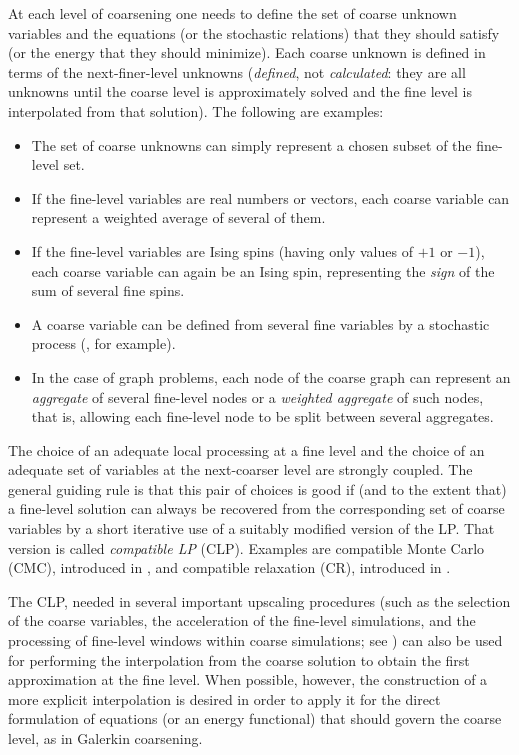 \documentclass[final]{siamltex}
\begin{document}
At each level of coarsening one needs to define the set of  coarse
unknown variables and the equations (or the stochastic relations)
that they should satisfy (or the energy that they should
minimize). Each coarse unknown is defined in terms of the
next-finer-level unknowns ({\it defined}, not {\it calculated}: they  are all unknowns until the coarse level is approximately solved and the fine level is interpolated from
that solution). The following are examples:
\begin{itemize}
    \item The set of coarse unknowns can simply represent a chosen
    subset of the fine-level set.
    \item If the fine-level variables are real numbers or vectors,
    each coarse variable can represent a weighted average of
    several of them.
    \item If the fine-level variables are Ising spins (having only
    values of $+1$ or $-1$), each coarse variable can again be an
    Ising spin, representing the {\it sign} of the sum of  several
    fine spins.
    \item A coarse variable can be defined from several fine
    variables by a stochastic process (\cite{blote96}, for example).
    \item In the case of graph problems, each node of the coarse
    graph can represent an {\it aggregate} of several fine-level
    nodes or a {\it weighted aggregate} of such nodes, that is,
    allowing each fine-level node to be split between several
    aggregates.
\end{itemize}

The choice of an adequate local processing at a fine level
and the choice of an adequate set of variables at the next-coarser level are
strongly coupled. The general guiding rule \cite{SU} is
that this pair of choices is good if (and to the extent that) a
fine-level solution can always be recovered from the corresponding
set of coarse variables by a short iterative use of a suitably
modified version of the LP. That version is called {\it compatible LP} (CLP).
Examples are compatible Monte Carlo (CMC), introduced in
\cite{brandt-renormalization}, and compatible relaxation (CR),
introduced in \cite{crs}.

The CLP, needed in several important upscaling procedures
(such as the selection of the coarse variables, the acceleration of the fine-level simulations,
and the processing of fine-level windows within coarse simulations; see
\cite{SU}) can also be used for performing the interpolation
from the coarse solution to obtain the first approximation at the
fine level. When possible, however, the construction of a more
explicit interpolation is desired in order to apply it for the direct formulation of
equations (or an energy functional) that should govern the
coarse level, as in Galerkin coarsening.
\end{document}
